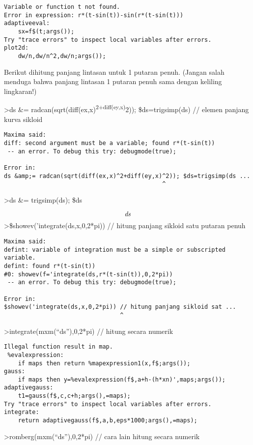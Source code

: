 \documentclass[
]{book}
\begin{document}
\begin{verbatim}
Variable or function t not found.
Error in expression: r*(t-sin(t))-sin(r*(t-sin(t)))
adaptiveeval:
    sx=f$(t;args());
Try "trace errors" to inspect local variables after errors.
plot2d:
    dw/n,dw/n^2,dw/n;args());
\end{verbatim}

Berikut dihitung panjang lintasan untuk 1 putaran penuh. (Jangan salah menduga bahwa panjang lintasan 1 putaran penuh sama dengan keliling lingkaran!)

\textgreater ds \&= radcan(sqrt(diff(ex,x)\textsuperscript{2+diff(ey,x)}2)); \$ds=trigsimp(ds) // elemen panjang kurva sikloid

\begin{verbatim}
Maxima said:
diff: second argument must be a variable; found r*(t-sin(t))
 -- an error. To debug this try: debugmode(true);

Error in:
ds &amp;= radcan(sqrt(diff(ex,x)^2+diff(ey,x)^2)); $ds=trigsimp(ds ...
                                             ^
\end{verbatim}

\textgreater ds \&= trigsimp(ds); \$ds

\[{\it ds}\]\textgreater\$showev('integrate(ds,x,0,2*pi)) // hitung panjang sikloid satu putaran penuh

\begin{verbatim}
Maxima said:
defint: variable of integration must be a simple or subscripted variable.
defint: found r*(t-sin(t))
#0: showev(f='integrate(ds,r*(t-sin(t)),0,2*pi))
 -- an error. To debug this try: debugmode(true);

Error in:
$showev('integrate(ds,x,0,2*pi)) // hitung panjang sikloid sat ...
                                 ^
\end{verbatim}

\textgreater integrate(mxm(``ds''),0,2*pi) // hitung secara numerik

\begin{verbatim}
Illegal function result in map.
 %evalexpression:
    if maps then return %mapexpression1(x,f$;args());
gauss:
    if maps then y=%evalexpression(f$,a+h-(h*xn)',maps;args());
adaptivegauss:
    t1=gauss(f$,c,c+h;args(),=maps);
Try "trace errors" to inspect local variables after errors.
integrate:
    return adaptivegauss(f$,a,b,eps*1000;args(),=maps);
\end{verbatim}

\textgreater romberg(mxm(``ds''),0,2*pi) // cara lain hitung secara numerik
\end{document}
